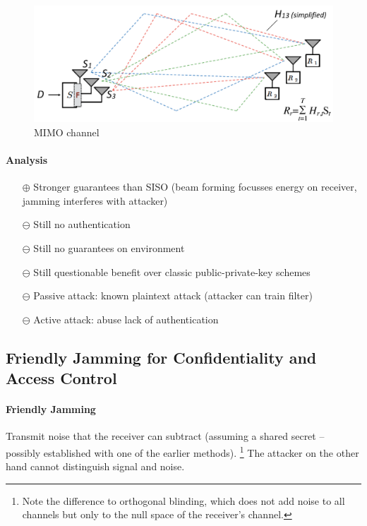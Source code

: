 \begin{figure}[h]
	\centering
	\includegraphics[scale=0.3]{images/7-mimo.png}
	\caption{MIMO channel}
	\label{fig:mimo}
\end{figure}

\paragraph{Analysis}
\begin{itemize}
	\item[$\oplus$] Stronger guarantees than SISO (beam forming focusses energy on receiver, jamming interferes with attacker)
	\item[$\ominus$] Still no authentication
	\item[$\ominus$] Still no guarantees on environment
	\item[$\ominus$] Still questionable benefit over classic public-private-key
	 schemes
	\item[$\ominus$] Passive attack: known plaintext attack (attacker can train filter)
	\item[$\ominus$] Active attack: abuse lack of authentication
\end{itemize}


\subsection{Friendly Jamming for Confidentiality and Access Control}

\paragraph{Friendly Jamming}
Transmit noise that the receiver can subtract (assuming a shared secret -- possibly established with one of the earlier methods).%
\footnote{Note the difference to orthogonal blinding, which does not add noise to all channels but only to the null space of the receiver's channel.}
The attacker on the other hand cannot distinguish signal and noise.


